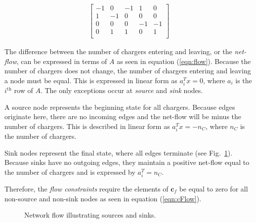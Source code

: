 \begin{align}
	\begin{bmatrix}
		-1 & 0 & -1 & 1 & 0 \\
		1 & -1 & 0 & 0 & 0 \\
		0 & 0 & 0 & -1 & -1 \\
		0 & 1 & 1 & 0 & 1 \\
	\end{bmatrix}
\end{align}
\par  The difference between the number of chargers entering and leaving, or the \textit{net-flow}, can be expressed in terms of $A$ as seen in equation (\ref{eqn:flow}).  Because the number of chargers does not change, the number of chargers entering and leaving a node must be equal. This is expressed in linear form as $a_i^{T}x = 0$, where $a_i$ is the $i^{\text{th}}$ row of $A$. The only exceptions occur at \textit{source} and \textit{sink} nodes.
\par A source node represents the beginning state for all chargers.  Because edges originate here, there are no incoming edges and the net-flow will be minus the number of chargers. This is described in linear form as $a_i^Tx = -n_C$, where $n_C$ is the number of chargers.
\par Sink nodes represent the final state, where all edges terminate (see Fig.~\ref{fig:sourceSink}). Because sinks have no outgoing edges, they maintain a positive net-flow equal to the number of chargers and is expressed by $a_i^T = n_C$. 
\par Therefore, the \textit{flow constraints} require the elements of $\mathbf{c}_f$ be equal to zero for all non-source and non-sink nodes as seen in equation (\ref{eqn:cFlow}).  
\begin{figure}
	\centering
{}
	\caption{Network flow illustrating sources and sinks.}
	\label{fig:sourceSink} 
\end{figure} 

